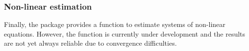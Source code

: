 \subsubsection*{Non-linear estimation}
Finally, the  package provides a function to estimate
systems of non-linear equations.
However, the function  is currently under
development and the results are not yet always reliable due to
convergence difficulties.




